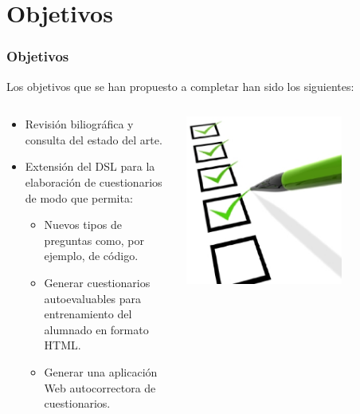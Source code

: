 \documentclass{beamer}
\begin{document}
\section{Objetivos}
\begin{frame}
  \frametitle{Objetivos}
  
  Los objetivos que se han propuesto a completar han sido los siguientes:
  \begin{columns}
    \begin{column}{9cm}
      \begin{itemize}
        \item Revisión biliográfica y consulta del estado del arte.
        \item Extensión del DSL para la elaboración de cuestionarios de modo que permita:
        \begin{itemize}
          \item Nuevos tipos de preguntas como, por ejemplo, de código.
          \item Generar cuestionarios autoevaluables para entrenamiento del alumnado en formato HTML.
          \item Generar una aplicación Web autocorrectora de cuestionarios.
        \end{itemize}
      \end{itemize}
    \end{column}
    \begin{column}{5cm}
      \includegraphics[width=0.7\textwidth]{img/checklist.eps}
    \end{column}
  \end{columns}
  
\end{frame}
\end{document}
